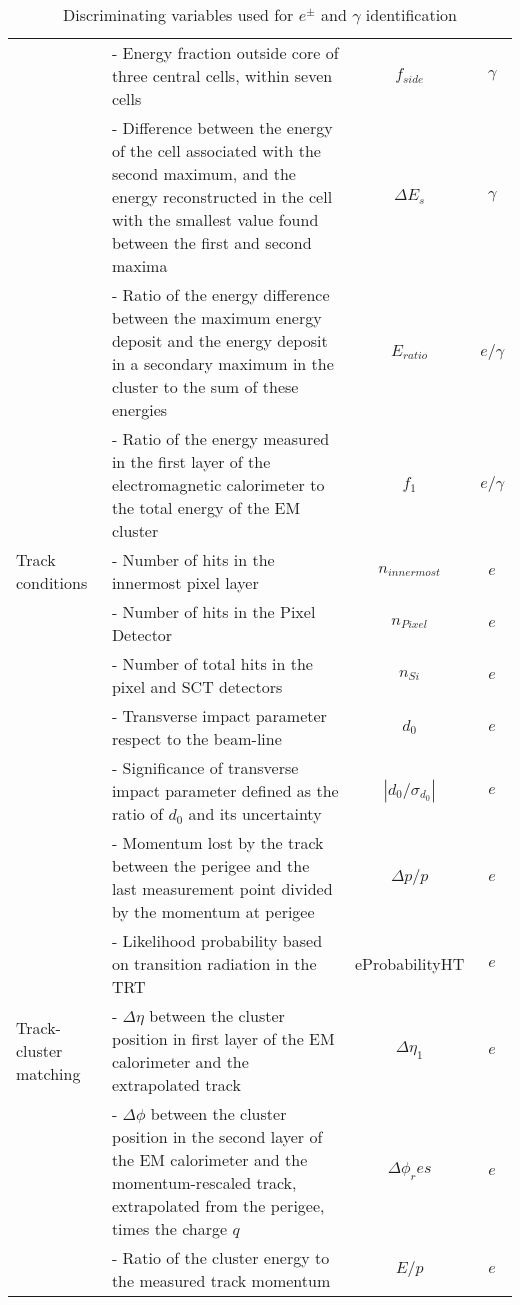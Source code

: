 \documentclass[a4paper, oneside, 11pt, openright]{book}
\begin{document}
\begin{center}
\begin{table}
{\begin{tabular}{lp{12cm}cc}
								& - Energy fraction outside core of three central cells, within seven cells & $f_{side}$ & $\gamma$ \\
								& - Difference between the energy of the cell associated with the second maximum, and the energy reconstructed in the cell with the smallest value found between the first and second maxima & $\Delta E_s$ & $\gamma$ \\
								& - Ratio of the energy difference between the maximum energy deposit and the energy deposit in a secondary maximum in the cluster to the sum of these energies & $E_{ratio}$ & $e/\gamma$ \\
								& - Ratio of the energy measured in the first layer of the electromagnetic calorimeter to the total energy of the EM cluster & $f_1$ & $e/\gamma$ \\
								\midrule
								Track conditions
								& - Number of hits in the innermost pixel layer & $n_{innermost}$ & $e$ \\
								& - Number of hits in the Pixel Detector & $n_{Pixel}$ & $e$ \\
								& - Number of total hits in the pixel and SCT detectors & $n_{Si}$ & $e$ \\
								& - Transverse impact parameter  respect to the beam-line & $d_0$ & $e$ \\
								& - Significance of transverse impact parameter defined as the ratio of $d_0$ and its uncertainty & $|d_0/\sigma_{d_0}|$ & $e$ \\
								& - Momentum lost by the track between the perigee and the last measurement point divided by the momentum at perigee & $\Delta p/p$ & $e$ \\ 
								& - Likelihood probability based on transition radiation in the TRT & eProbabilityHT  & $e$ \\
								\midrule
								Track-cluster matching
								& - $\Delta \eta$ between the cluster position in first layer of the EM calorimeter and the extrapolated track & $\Delta \eta_1$ & $e$ \\
								& - $\Delta \phi$ between the cluster position in the second layer of the EM calorimeter and the momentum-rescaled track, extrapolated from the perigee, times the charge $q$ & $\Delta \phi_res$ & $e$ \\
								& - Ratio of the cluster energy to the measured track momentum & $E/p$ & $e$ \\
								\bottomrule[1.5pt]
						\end{tabular}}
						\caption{Discriminating variables used for $e^{\pm}$ and $\gamma$ identification \cite{Aad_2019}}
						\label{tab:parameters}
					\end{table}
				\end{center} 
\end{document}
